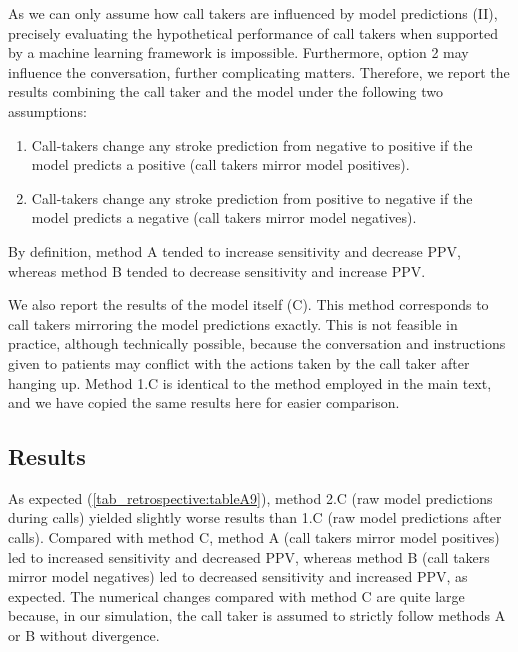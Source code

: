 {As we can only assume how call takers are influenced by model predictions (II), precisely evaluating the hypothetical performance of call takers when supported by a machine learning framework is impossible. Furthermore, option 2 may influence the conversation, further complicating matters. Therefore, we report the results combining the call taker and the model under the following two assumptions:
%
\begin{enumerate}[label=\Alph*.]
    \item Call-takers change any stroke prediction from negative to positive if the model predicts a positive (call takers mirror model positives).
    \item Call-takers change any stroke prediction from positive to negative if the model predicts a negative (call takers mirror model negatives).
\end{enumerate}
%
By definition, method A tended to increase sensitivity and decrease PPV, whereas method B tended to decrease sensitivity and increase PPV.

We also report the results of the model itself (C). This method corresponds to call takers mirroring the model predictions exactly. This is not feasible in practice, although technically possible, because the conversation and instructions given to patients may conflict with the actions taken by the call taker after hanging up. Method 1.C is identical to the method employed in the main text, and we have copied the same results here for easier comparison.


\subsection{Results}

As expected (\cref{tab_retrospective:tableA9}), method 2.C (raw model predictions during calls) yielded slightly worse results than 1.C (raw model predictions after calls). Compared with method C, method A (call takers mirror model positives) led to increased sensitivity and decreased PPV, whereas method B (call takers mirror model negatives) led to decreased sensitivity and increased PPV, as expected. The numerical changes compared with method C are quite large because, in our simulation, the call taker is assumed to strictly follow methods A or B without divergence.

\begin{sidewaystable}
    \centering
    \caption{Overall performance of model, call takers and simulated combinations of model and call takers on MH-1813 test data.}
    \label{tab_retrospective:tableA9}
\end{sidewaystable}}
